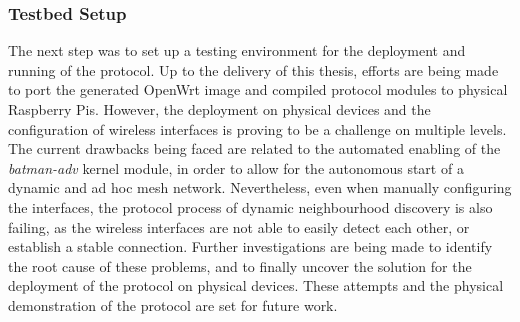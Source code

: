 \subsubsection{Testbed Setup} \label{sec:infrastructure:testbed}


The next step was to set up a testing environment for the deployment and running of the \pol{} protocol. Up to the delivery of this thesis, efforts are being made to port the generated OpenWrt image and compiled protocol modules to physical Raspberry Pis. However, the deployment on physical devices and the configuration of wireless interfaces is proving to be a challenge on multiple levels. The current drawbacks being faced are related to the automated enabling of the \emph{batman-adv} kernel module, in order to allow for the autonomous start of a dynamic and ad hoc mesh network. Nevertheless, even when manually configuring the interfaces, the protocol process of dynamic neighbourhood discovery is also failing, as the wireless interfaces are not able to easily detect each other, or establish a stable connection. Further investigations are being made to identify the root cause of these problems, and to finally uncover the solution for the deployment of the protocol on physical devices. These attempts and the physical demonstration of the \pol{} protocol are set for future work.

